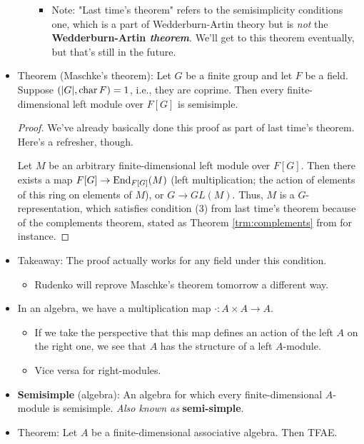 \documentclass[../notes.tex]{subfiles}
\begin{document}
\begin{itemize}
\begin{itemize}
\begin{itemize}
            \item Note: "Last time's theorem" refers to the semisimplicity conditions one, which is a part of Wedderburn-Artin theory but is \emph{not} the \textbf{Wedderburn-Artin \emph{theorem}}. We'll get to this theorem eventually, but that's still in the future.
        \end{itemize}
    \end{itemize}
    \item Theorem (Maschke's theorem): Let $G$ be a finite group and let $F$ be a field. Suppose $(|G|,\operatorname{char} F)=1$, i.e., they are coprime. Then every finite-dimensional left module over $F[G]$ is semisimple.
    \begin{proof}
        We've already basically done this proof as part of last time's theorem. Here's a refresher, though.\par
        Let $M$ be an arbitrary finite-dimensional left module over $F[G]$. Then there exists a map $F[G]\to\operatorname{End}_{F[G]}(M)$ (left multiplication; the action of elements of this ring on elements of $M$), or $G\to GL(M)$. Thus, $M$ is a $G$-representation, which satisfies condition (3) from last time's theorem because of the complements theorem, stated as Theorem \ref{trm:complements} from \textcite{bib:Serre} for instance.
    \end{proof}
    \item Takeaway: The proof actually works for any field under this condition.
    \begin{itemize}
        \item Rudenko will reprove Maschke's theorem tomorrow a different way.
    \end{itemize}
    \item In an algebra, we have a multiplication map $\cdot:A\times A\to A$.
    \begin{itemize}
        \item If we take the perspective that this map defines an action of the left $A$ on the right one, we see that $A$ has the structure of a left $A$-module.
        \item Vice versa for right-modules.
    \end{itemize}
    \item \textbf{Semisimple} (algebra): An algebra for which every finite-dimensional $A$-module is semisimple. \emph{Also known as} \textbf{semi-simple}.
    \item Theorem: Let $A$ be a finite-dimensional associative algebra. Then TFAE.
    \begin{enumerate}

\end{enumerate}
\end{itemize}
\end{document}

